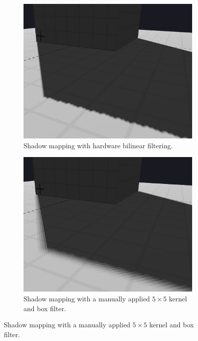 \begin{figure}[t]
    \centering
    \begin{subfigure}[t]{0.45\textwidth}
        \includegraphics[width=\textwidth]{./graf/PCF_bilinear.png}
        \caption{Shadow mapping with hardware bilinear filtering.}
        \label{fig:pcf_bilinear}
    \end{subfigure}
    \hfill
    \begin{subfigure}[t]{0.45\textwidth}
        \includegraphics[width=\textwidth]{./graf/PCF_manual_kernel_5x5.png}
        \caption{Shadow mapping with a manually applied \(5\times 5\) kernel and box filter.}
        \label{fig:pcf_manual}
    \end{subfigure}


\end{figure}

